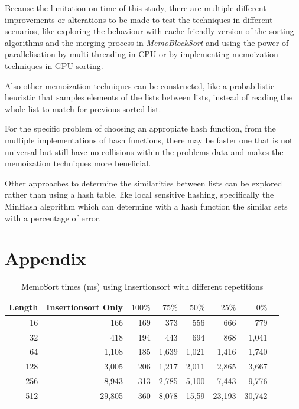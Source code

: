 \documentclass[a4paper,12pt]{article}
\begin{document}
Because the limitation on time of this study, there are multiple different improvements or alterations to be made to test the techniques in different scenarios, like exploring the behaviour with cache friendly version of the sorting algorithms and the merging process in {\it MemoBlockSort} and using the power of parallelisation by multi threading in CPU or by implementing memoization techniques in GPU sorting.

Also other memoization techniques can be constructed, like a probabilistic heuristic that samples elements of the lists between lists, instead of reading the whole list to match for previous sorted list.

For the specific problem of choosing an appropiate hash function, from the multiple implementations of hash functions, there may be faster one that is not universal but still have no collisions within the problems data and makes the memoization techniques more beneficial.

Other approaches to determine the similarities between lists can be explored rather than using a hash table, like local sensitive hashing, specifically the MinHash algorithm which can determine with a hash function the similar sets with a percentage of error.






\section{Appendix}

\begin{table}[H]
\centering
\begin{tabular}{|r|r|r|r|r|r|r|r|}   \hline
	{Length} & {Insertionsort Only} & {$100\%$} & {$75\%$} & {$50\%$} & {$25\%$} & {$0\%$} \\  \hline
	16 &166 &169&373& 556& 666& 779\\ 
	32 &418 &194&443& 694& 868& 1,041\\ 
	64 &1,108&185 &1,639&1,021&1,416 & 1,740\\ 
	128 &3,005 &206&1,217&2,011&2,865 &3,667\\ 
	256 &8,943 &313&2,785&5,100&7,443&9,776\\ 
	512 &29,805& 360&8,078&15,59 &23,193 &30,742\\  \hline
\end{tabular}
\caption{MemoSort times (ms) using Insertionsort with different repetitions}
\end{table}
\end{document}
